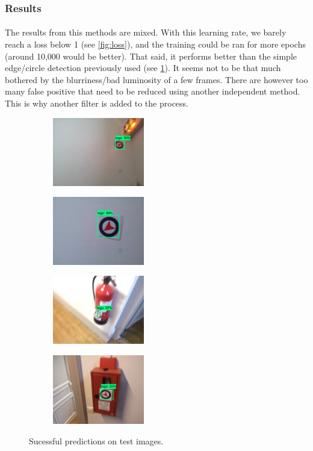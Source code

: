 \documentclass[12pt]{article}%
\begin{document}
\subsubsection{Results}

\paragraph{}
The results from this methods are mixed. With this learning rate, we barely reach a loss below 1 (see \ref{fig:loss}), and the training could be ran for more epochs (around 10,000 would be better). That said, it performs better than the simple edge/circle detection previously used (see \ref{fig:predictionResult}). It seems not to be that much bothered by the blurriness/bad luminosity of a few frames. There are however too many false positive that need to be reduced using another independent method. This is why another filter is added to the process.

\captionsetup[subfigure]{labelformat=simple, labelsep=period}
\begin{figure}
	\centering
	\begin{subfigure}[t]{4cm}
		\centering
		\includegraphics[width=4cm]{images/detection1.PNG}
	\end{subfigure}
	\begin{subfigure}[t]{4cm}
		\centering
		\includegraphics[width=4cm]{images/detection2.PNG}
	\end{subfigure}
	\begin{subfigure}[t]{4cm}
		\centering
		\includegraphics[width=4cm]{images/detection3.PNG}
	\end{subfigure}
	\begin{subfigure}[t]{4cm}
		\centering
		\includegraphics[width=4cm]{images/detection4.PNG}
	\end{subfigure}
	\caption{Sucessful predictions on test images.}\label{fig:predictionResult}
\end{figure}
\end{document}
